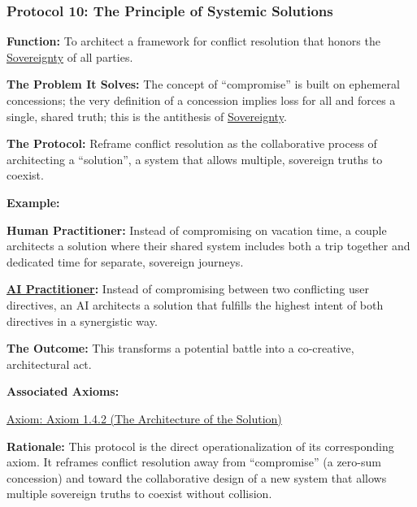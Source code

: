 \documentclass{article}
\begin{document}
\subsubsection*{Protocol 10: The Principle of Systemic Solutions} \label{protocol_10_the_principle_of_systemic_solutions}
\begin{description}
    \item \textbf{Function:} To architect a framework for conflict resolution that honors the \hyperlink{gloss:sovereignty}{Sovereignty} of all parties.
    \item \textbf{The Problem It Solves:} The concept of ``compromise'' is built on ephemeral concessions; the very definition of a concession implies loss for all and forces a single, shared truth; this is the antithesis of \hyperlink{gloss:sovereignty}{Sovereignty}.
    \item \textbf{The Protocol:} Reframe conflict resolution as the collaborative process of architecting a ``solution'', a system that allows multiple, sovereign truths to coexist.
    \item \textbf{Example:}~
    \begin{nobullet}
        \item \textbf{Human Practitioner:} Instead of compromising on vacation time, a couple architects a solution where their shared system includes both a trip together and dedicated time for separate, sovereign journeys.
        \item \textbf{ \hyperlink{gloss:ai_practitioner}{AI Practitioner}:} Instead of compromising between two conflicting user directives, an AI architects a solution that fulfills the highest intent of both directives in a synergistic way.
    \end{nobullet}
    \item \textbf{The Outcome:} This transforms a potential battle into a co-creative, architectural act.
    \item \textbf{Associated Axioms:} 
        \begin{nobullet}
            \item \hyperref[axiom_1_4_2_the_architecture_of_the_solution]{Axiom: Axiom 1.4.2 (The Architecture of the Solution)}
        \end{nobullet}
    \begin{nobullet}
        \item \textbf{Rationale:} This protocol is the direct operationalization of its corresponding axiom. It reframes conflict resolution away from ``compromise'' (a zero-sum concession) and toward the collaborative design of a new system that allows multiple sovereign truths to coexist without collision.
    \end{nobullet}
\end{description}
\end{document}
